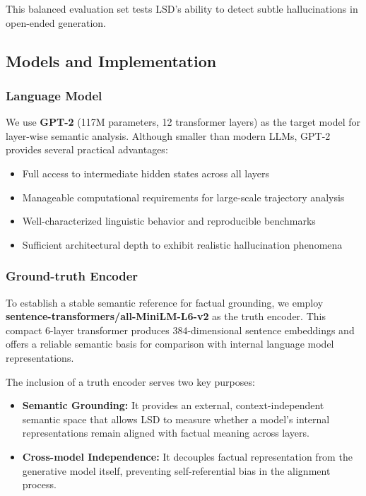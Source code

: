 \documentclass[11pt]{article}
\begin{document}
This balanced evaluation set tests LSD's ability to detect subtle hallucinations in open-ended generation.

\subsection{Models and Implementation}

\subsubsection{Language Model}
We use \textbf{GPT-2} (117M parameters, 12 transformer layers) as the target model for layer-wise semantic analysis. Although smaller than modern LLMs, GPT-2 provides several practical advantages:
\begin{itemize}[leftmargin=*]
    \item Full access to intermediate hidden states across all layers
    \item Manageable computational requirements for large-scale trajectory analysis
    \item Well-characterized linguistic behavior and reproducible benchmarks
    \item Sufficient architectural depth to exhibit realistic hallucination phenomena
\end{itemize}

\subsubsection{Ground-truth Encoder}
To establish a stable semantic reference for factual grounding, we employ \textbf{sentence-transformers/all-MiniLM-L6-v2} as the truth encoder. This compact 6-layer transformer produces 384-dimensional sentence embeddings and offers a reliable semantic basis for comparison with internal language model representations. 

The inclusion of a truth encoder serves two key purposes:
\begin{itemize}[leftmargin=*]
    \item \textbf{Semantic Grounding:} It provides an external, context-independent semantic space that allows LSD to measure whether a model’s internal representations remain aligned with factual meaning across layers.
    \item \textbf{Cross-model Independence:} It decouples factual representation from the generative model itself, preventing self-referential bias in the alignment process.
\end{itemize}
\end{document}
